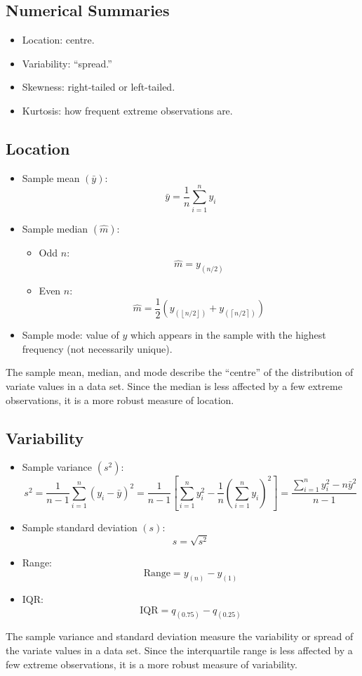 \subsection*{Numerical Summaries}
\begin{itemize}
    \item Location: centre.
    \item Variability: ``spread.''
    \item Skewness: right-tailed or left-tailed.
    \item Kurtosis: how frequent extreme observations are.
\end{itemize}

\subsection*{Location}
\begin{itemize}
    \item Sample mean $ \left( \bar{y} \right) $:
          \[ \bar{y}=\frac{1}{n} \sum_{i=1}^{n} y_{i} \]
    \item Sample median $ \left( \hat{m} \right) $:
          \begin{itemize}
              \item Odd $ n $:
                    \[ \hat{m}=y_{\left(n/2\right)} \]
              \item Even $ n $:
                    \[ \hat{m}=\frac{1}{2} \left( y_{\left(\left\lfloor n/2\right\rfloor\right)} +
                        y_{\left(\left\lceil n/2\right\rceil\right)}\right) \]
          \end{itemize}
    \item Sample mode: value of $ y $ which appears in the sample with the highest frequency
          (not necessarily unique).
\end{itemize}
The sample mean, median, and mode describe the ``centre'' of the distribution
of variate values in a data set. Since the median is less affected by a few extreme
observations, it is a more robust measure of location.

\subsection*{Variability}
\begin{itemize}
    \item Sample variance $ \left( s^2 \right) $:
          \[ s^{2}=\frac{1}{n-1} \sum_{i=1}^{n}\left(y_{i}-\bar{y}\right)^{2}
              =\frac{1}{n-1}\left[\sum_{i=1}^{n} y_{i}^{2}-\frac{1}{n}
                  \left(\sum_{i=1}^{n} y_{i}\right)^{2}\right]
              =\frac{\sum_{i=1}^{n} y_{i}^{2}-n \bar{y}^{2}}{n-1} \]
    \item Sample standard deviation $ \left( s \right) $:
          \[ s=\sqrt{s^2} \]
    \item Range:
          \[ \text{Range}=y_{(n)}-y_{(1)} \]
    \item IQR\@:
          \[ \text{IQR}=q_{(0.75)}-q_{(0.25)} \]
\end{itemize}
The sample variance and standard deviation measure the variability or spread of the
variate values in a data set. Since the interquartile range is less affected
by a few extreme observations, it is a more robust measure of variability.
